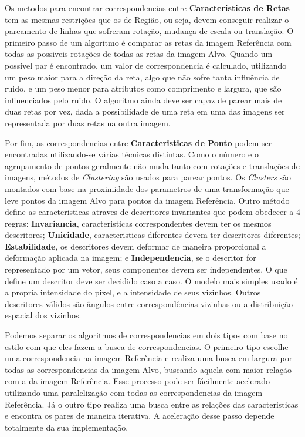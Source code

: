     Os metodos para encontrar correspondencias entre \textbf{Caracteristicas de Retas} tem as mesmas restrições que os
de Região, ou seja, devem conseguir realizar o pareamento de linhas que sofreram rotação, mudança de escala ou translação.
O primeiro passo de um algoritmo é comparar as retas da imagem Referência com todas as possiveis rotações de todas as retas
da imagem Alvo. Quando um possivel par é encontrado, um valor de correspondencia é calculado, utilizando um peso maior para
a direção da reta, algo que não sofre tanta influência de ruido, e um peso menor para atributos como comprimento e largura,
que são influenciados pelo ruido. O algoritmo ainda deve ser capaz de parear mais de duas retas por vez, dada a possibilidade
de uma reta em uma das imagens ser representada por duas retas na outra imagem.

    Por fim, as correspondencias entre \textbf{Caracteristicas de Ponto} podem ser encontradas utilizando-se várias técnicas
distintas. Como o número e o agrupamento de pontos geralmente não muda tanto com rotações e translações de imagens, métodos de 
\textit{Clustering} são usados para parear pontos. Os \textit{Clusters} são montados com base na proximidade dos parametros
de uma transformação que leve pontos da imagem Alvo para pontos da imagem Referência. Outro método define as caracteristicas
atraves de descritores invariantes que podem obedecer a 4 regras: \textbf{Invariancia}, caracteristicas correspondentes 
devem ter os mesmos descritores; \textbf{Unicidade}, caracteristicas diferentes devem ter descritores diferentes; 
\textbf{Estabilidade}, os descritores devem deformar de maneira proporcional a deformação aplicada na imagem; e 
\textbf{Independencia}, se o descritor for representado por um vetor, seus componentes devem ser independentes. 
O que define um descritor deve ser decidido caso a caso. O modelo mais simples usado é a propria intensidade do pixel, 
e a intensidade de seus vizinhos. Outros descritores válidos são ângulos entre correspondências vizinhas ou a distribuição
espacial dos vizinhos.

    Podemos separar os algoritmos de correspondencias em dois tipos com base no estilo com que eles fazem a busca de 
correspondencias. O primeiro tipo escolhe uma correspondencia na imagem Referência e realiza uma busca em largura por
todas as correspondencias da imagem Alvo, buscando aquela com maior relação com a da imagem Referência. Esse processo
pode ser fácilmente acelerado utilizando uma paralelização com todas as correspondencias da imagem Referência. Já o outro
tipo realiza uma busca entre as relações das caracteristicas e encontra os pares de maneira iterativa. A aceleração
desse passo depende totalmente da sua implementação.

